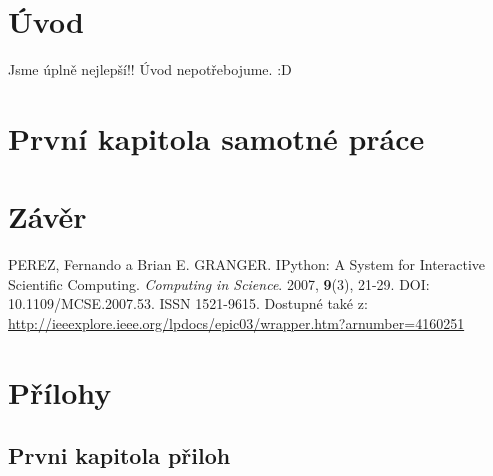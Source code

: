 \documentclass[12pt, a4paper]{article}
\numberwithin{equation}{section} 	%
\begin{document}

\newpage
\section*{Úvod}
\noindent Jsme úplně nejlepší!! Úvod nepotřebojume. :D


\newpage
\section{První kapitola samotné práce}
\noindent


\newpage
\section{Závěr}
\noindent

\newpage
\begin{thebibliography}{99}
PEREZ, Fernando a Brian E. GRANGER. IPython: A System for Interactive Scientific Computing. \textit{Computing in Science}. 2007, \textbf{9}(3), 21-29. DOI: 10.1109/MCSE.2007.53. ISSN 1521-9615. Dostupné také z: \url{http://ieeexplore.ieee.org/lpdocs/epic03/wrapper.htm?arnumber=4160251}
\end{thebibliography}

\newpage
\section*{Přílohy}
\subsection*{Prvni kapitola přiloh}
\noindent
\end{document}
